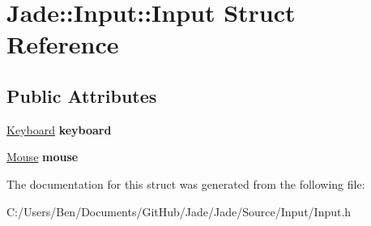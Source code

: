 \hypertarget{struct_jade_1_1_input_1_1_input}{}\section{Jade\+:\+:Input\+:\+:Input Struct Reference}
\label{struct_jade_1_1_input_1_1_input}
\subsection*{Public Attributes}
\begin{DoxyCompactItemize}
\item 
\hypertarget{struct_jade_1_1_input_1_1_input_aca95e2a903215ba70da065dccc7e31a4}{}\hyperlink{class_jade_1_1_input_1_1_keyboard}{Keyboard} {\bfseries keyboard}\label{struct_jade_1_1_input_1_1_input_aca95e2a903215ba70da065dccc7e31a4}

\item 
\hypertarget{struct_jade_1_1_input_1_1_input_a00a7550d803462e03f3e6984a351d130}{}\hyperlink{class_jade_1_1_input_1_1_mouse}{Mouse} {\bfseries mouse}\label{struct_jade_1_1_input_1_1_input_a00a7550d803462e03f3e6984a351d130}

\end{DoxyCompactItemize}


The documentation for this struct was generated from the following file\+:\begin{DoxyCompactItemize}
\item 
C\+:/\+Users/\+Ben/\+Documents/\+Git\+Hub/\+Jade/\+Jade/\+Source/\+Input/Input.\+h\end{DoxyCompactItemize}
